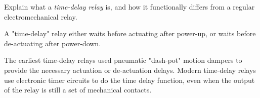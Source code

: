 

Explain what a {\it time-delay relay} is, and how it functionally differs from a regular electromechanical relay.







A "time-delay" relay either waits before actuating after power-up, or waits before de-actuating after power-down.







The earliest time-delay relays used pneumatic "dash-pot" motion dampers to provide the necessary actuation or de-actuation delays.  Modern time-delay relays use electronic timer circuits to do the time delay function, even when the output of the relay is still a set of mechanical contacts.




